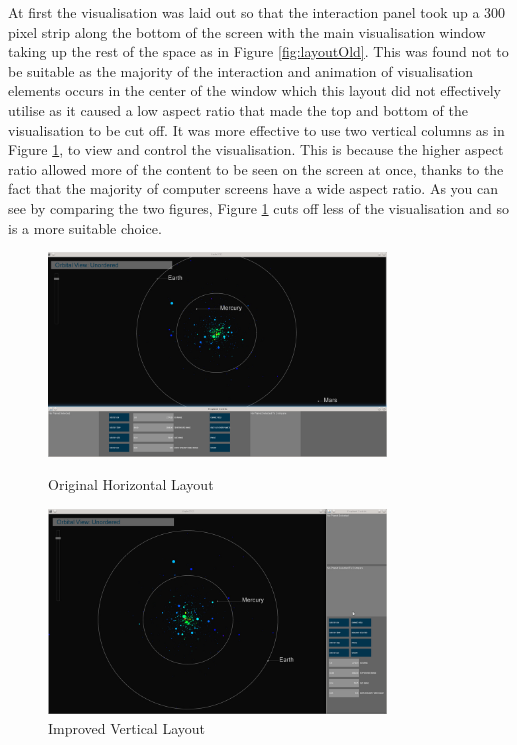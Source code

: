 At first the visualisation was laid out so that the interaction panel took up a
300 pixel strip along the bottom of the screen with the main visualisation
window
taking up the rest of the space as in Figure \ref{fig:layoutOld}.
 This was found not to be suitable as the majority of the interaction and
animation of visualisation elements occurs
in the center of the window which this layout did not effectively utilise as it
caused a low aspect ratio that made the top and bottom of the visualisation to be
cut off. It
was more effective to use two vertical columns as in Figure \ref{fig:layoutNew},
to view and control the visualisation. This is because
the higher aspect ratio allowed more of the content to be seen on the
screen at once, thanks to the fact that the majority of computer screens have a
wide aspect ratio. As you can see by comparing the two figures, Figure
\ref{fig:layoutNew} cuts off less of the visualisation and so is a more suitable
choice.

\begin{figure}[H]
  \centering
      \includegraphics[width=0.8\textwidth]{images/layout_horizontal.jpg}
  \caption{Original Horizontal Layout}  
    \label{fig:layoutOld}
        \includegraphics[width=0.8\textwidth]{images/layout_vertical.jpg}
  \caption{Improved Vertical Layout}
  \label{fig:layoutNew}
\end{figure}

